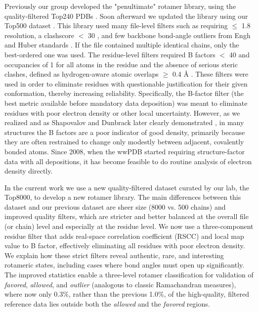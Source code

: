 Previously our group developed the "penultimate" rotamer library, using the quality-filtered Top240 PDBs \cite{lovell2000penultimate}. Soon afterward we updated the library using our Top500 dataset \cite{Lovell:2003uq}. This library used many file-level filters such as requiring $\le$ 1.8 resolution, a clashscore $<$ 30 \cite{Word1999}, and few backbone bond-angle outliers from Engh and Huber standards \cite{Engh1991}. \textcolor{changecolor}{If the file contained multiple identical chains, only the best-ordered one was used}. The residue-level filters required B factors $<$ 40  \textcolor{changecolor}{and occupancies of 1} for all atoms in the residue and the absence of serious steric clashes, defined as hydrogen-aware atomic overlaps $\ge$ 0.4 \AA{} \cite{Word1999}. These filters were used in order to eliminate residues with questionable justification for their given conformation, thereby increasing reliability. Specifically, the B-factor filter (the best metric available before mandatory data deposition) was meant to eliminate residues with poor electron density or other local uncertainty. However, as we realized and as Shapovalov and Dunbrack later clearly demonstrated \cite{Shapovalov:2007}, in many structures the B factors are a poor indicator of good density, primarily because they are often restrained to change only modestly between adjacent, covalently bonded atoms. Since 2008, when the wwPDB started requiring structure-factor data with all depositions, it has become feasible to do routine analysis of electron density directly.

In the current work we use a new quality-filtered dataset curated by our lab, the Top8000, to develop a new rotamer library. The main differences between this dataset and our previous dataset are sheer size (8000 vs. 500 chains) and improved quality filters, which are stricter and better balanced at the \textcolor{changecolor}{overall file (or chain)} level and especially at the residue level. We now use a three-component residue filter that adds real-space correlation coefficient (RSCC) and local map value to B factor, effectively eliminating all residues with poor electron density. We explain how these strict filters reveal authentic, rare, and interesting rotameric states, including cases where bond angles must open up significantly. The improved statistics enable a three-level rotamer classification for validation of \textit{favored}, \textit{allowed}, and \textit{outlier} (analogous to classic Ramachandran measures), where now only 0.3\%, rather than the previous 1.0\%, of the high-quality, filtered reference data lies outside both the \textit{allowed} and the \textit{favored} regions.
